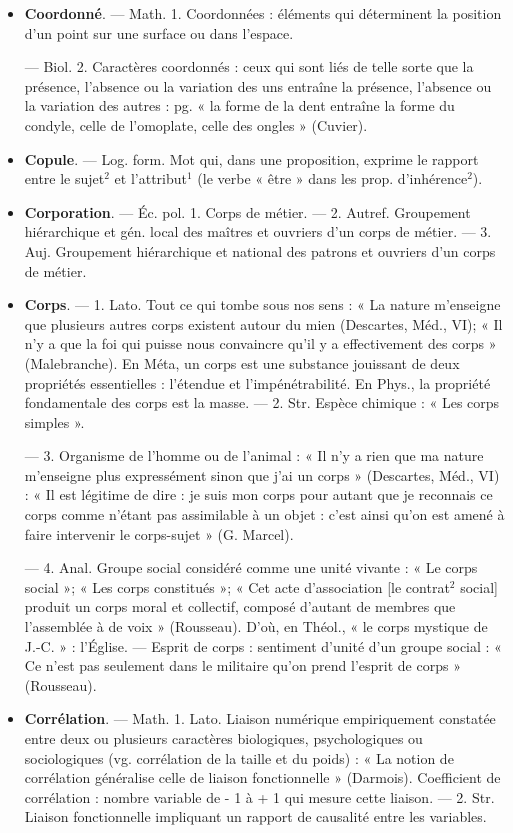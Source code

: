 \begin{itemize}[leftmargin=1cm, label=, itemsep=11pt]
\item {\bf Coordonné}. — Math. 1. Coordonnées :
éléments qui déterminent la position d’un point sur une surface ou
dans l’espace.

— Biol. 2. Caractères coordonnés :
ceux qui sont liés de telle sorte que
la présence, l’absence ou la variation
des uns entraîne la présence, l’absence ou la variation des autres : pg.
« la forme de la dent entraîne la
forme du condyle, celle de l’omoplate, celle des ongles » (Cuvier).

\item {\bf Copule}. — Log. form. Mot qui, dans
une proposition, exprime le rapport
entre le sujet$^2$ et l’attribut$^1$ (le verbe
« être » dans les prop. d’inhérence$^2$).

\item {\bf Corporation}. — Éc. pol. 1. Corps de
métier. — 2. Autref. Groupement
hiérarchique et gén. local des maîtres et ouvriers d’un corps de métier.
— 3. Auj. Groupement hiérarchique
et national des patrons et ouvriers
d'un corps de métier.

\item {\bf Corps}. — 1. Lato. Tout ce qui tombe
sous nos sens : « La nature m'enseigne que plusieurs autres corps
existent autour du mien (Descartes,
Méd., VI); « Il n’y a que la foi qui
puisse nous convaincre qu'il y a
effectivement des corps » (Malebranche). En Méta, un corps est
une substance jouissant de deux
propriétés essentielles : l'étendue et
l'impénétrabilité. En Phys., la propriété fondamentale des corps est la
masse. — 2. Str. Espèce chimique :
« Les corps simples ».

— 3. Organisme de l’homme ou
de l’animal : « Il n’y a rien que ma
nature m'enseigne plus expressément sinon que j’ai un corps » (Descartes, Méd., VI) : « Il est légitime
de dire : je suis mon corps pour
autant que je reconnais ce corps
comme n'étant pas assimilable à
un objet : c’est ainsi qu’on est amené
à faire intervenir le corps-sujet »
(G. Marcel).

— 4. Anal. Groupe social considéré comme une unité vivante : « Le
corps social »; « Les corps constitués »; « Cet acte d'association [le
contrat$^2$ social] produit un corps
moral et collectif, composé d’autant
de membres que l’assemblée à de
voix » (Rousseau). D’où, en Théol.,
« le corps mystique de J.-C. » :
l'Église. — Esprit de corps : sentiment d'unité d’un groupe social :
« Ce n’est pas seulement dans le militaire qu'on prend l'esprit de corps »
(Rousseau).

\item {\bf Corrélation}. — Math. 1. Lato. Liaison
numérique empiriquement constatée
entre deux ou plusieurs caractères
biologiques, psychologiques ou sociologiques (vg. corrélation de la taille
et du poids) : « La notion de corrélation généralise celle de liaison
fonctionnelle » (Darmois). Coefficient de corrélation : nombre variable de - 1 à + 1 qui mesure cette
liaison. — 2. Str. Liaison fonctionnelle
impliquant un rapport de causalité entre les variables.


\end{itemize}
